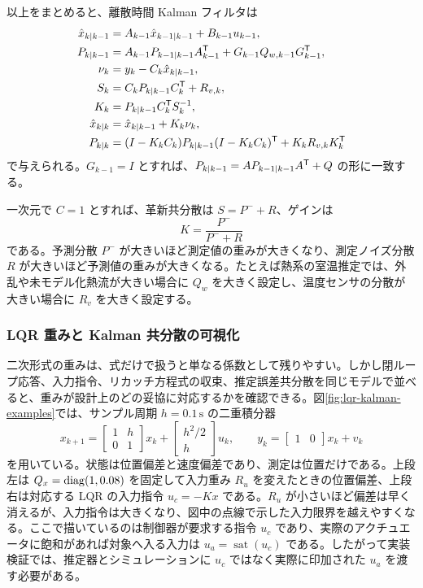 以上をまとめると、離散時間 Kalman フィルタは
\begin{align}
  \hat{x}_{k|k-1}&=A_{k-1}\hat{x}_{k-1|k-1}+B_{k-1}u_{k-1},\\
  P_{k|k-1}&=A_{k-1}P_{k-1|k-1}A_{k-1}^{\mathsf{T}}
    +G_{k-1}Q_{w,k-1}G_{k-1}^{\mathsf{T}},\\
  \nu_k&=y_k-C_k\hat{x}_{k|k-1},\\
  S_k&=C_kP_{k|k-1}C_k^{\mathsf{T}}+R_{v,k},\\
  K_k&=P_{k|k-1}C_k^{\mathsf{T}} S_k^{-1},\\
  \hat{x}_{k|k}&=\hat{x}_{k|k-1}+K_k\nu_k,\\
  P_{k|k}&=(I-K_kC_k)P_{k|k-1}(I-K_kC_k)^{\mathsf{T}}+K_kR_{v,k}K_k^{\mathsf{T}}
\end{align}
で与えられる。$G_{k-1}=I$ とすれば、$P_{k|k-1}=AP_{k-1|k-1}A^{\mathsf{T}}+Q$ の形に一致する。

一次元で $C=1$ とすれば、革新共分散は $S=P^-+R$、ゲインは
\begin{equation}
  K=\frac{P^-}{P^-+R}
\end{equation}
である。予測分散 $P^-$ が大きいほど測定値の重みが大きくなり、測定ノイズ分散 $R$ が大きいほど予測値の重みが大きくなる。たとえば熱系の室温推定では、外乱や未モデル化熱流が大きい場合に $Q_w$ を大きく設定し、温度センサの分散が大きい場合に $R_v$ を大きく設定する。

\subsubsection{LQR 重みと Kalman 共分散の可視化}

二次形式の重みは、式だけで扱うと単なる係数として残りやすい。しかし閉ループ応答、入力指令、リカッチ方程式の収束、推定誤差共分散を同じモデルで並べると、重みが設計上のどの妥協に対応するかを確認できる。図\ref{fig:lqr-kalman-examples}では、サンプル周期 $h=0.1\,\mathrm{s}$ の二重積分器
\begin{equation}
  x_{k+1}
  =
  \begin{bmatrix}
    1 & h\\
    0 & 1
  \end{bmatrix}x_k
  +
  \begin{bmatrix}
    h^2/2\\
    h
  \end{bmatrix}u_k,
  \qquad
  y_k=\begin{bmatrix}1&0\end{bmatrix}x_k+v_k
\end{equation}
を用いている。状態は位置偏差と速度偏差であり、測定は位置だけである。上段左は $Q_x=\operatorname{diag}(1,0.08)$ を固定して入力重み $R_u$ を変えたときの位置偏差、上段右は対応する LQR の入力指令 $u_c=-Kx$ である。$R_u$ が小さいほど偏差は早く消えるが、入力指令は大きくなり、図中の点線で示した入力限界を越えやすくなる。ここで描いているのは制御器が要求する指令 $u_c$ であり、実際のアクチュエータに飽和があれば対象へ入る入力は $u_a=\operatorname{sat}(u_c)$ である。したがって実装検証では、推定器とシミュレーションに $u_c$ ではなく実際に印加された $u_a$ を渡す必要がある。

